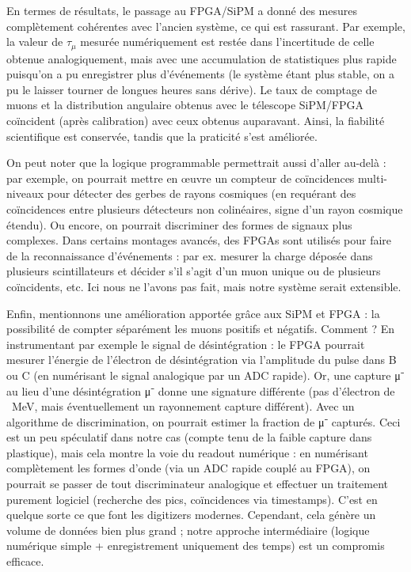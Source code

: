 \documentclass[a4paper,12pt,twoside]{article}
\begin{document}
En termes de résultats, le passage au FPGA/SiPM a donné des mesures complètement cohérentes avec l'ancien système, ce qui est rassurant. Par exemple, la valeur de $\tau_\mu$ mesurée numériquement est restée dans l’incertitude de celle obtenue analogiquement, mais avec une accumulation de statistiques plus rapide puisqu’on a pu enregistrer plus d’événements (le système étant plus stable, on a pu le laisser tourner de longues heures sans dérive). Le taux de comptage de muons et la distribution angulaire obtenus avec le télescope SiPM/FPGA coïncident (après calibration) avec ceux obtenus auparavant. Ainsi, la fiabilité scientifique est conservée, tandis que la praticité s’est améliorée.

On peut noter que la logique programmable permettrait aussi d’aller au-delà : par exemple, on pourrait mettre en œuvre un compteur de coïncidences multi-niveaux pour détecter des gerbes de rayons cosmiques (en requérant des coïncidences entre plusieurs détecteurs non colinéaires, signe d’un rayon cosmique étendu). Ou encore, on pourrait discriminer des formes de signaux plus complexes. Dans certains montages avancés, des FPGAs sont utilisés pour faire de la reconnaissance d’événements : par ex. mesurer la charge déposée dans plusieurs scintillateurs et décider s’il s’agit d’un muon unique ou de plusieurs coïncidents, etc. Ici nous ne l’avons pas fait, mais notre système serait extensible.

Enfin, mentionnons une amélioration apportée grâce aux SiPM et FPGA : la possibilité de compter séparément les muons positifs et négatifs. Comment ? En instrumentant par exemple le signal de désintégration : le FPGA pourrait mesurer l’énergie de l'électron de désintégration via l’amplitude du pulse dans B ou C (en numérisant le signal analogique par un ADC rapide). Or, une capture μ⁻ au lieu d’une désintégration μ⁻ donne une signature différente (pas d’électron de ~MeV, mais éventuellement un rayonnement capture différent). Avec un algorithme de discrimination, on pourrait estimer la fraction de μ⁻ capturés. Ceci est un peu spéculatif dans notre cas (compte tenu de la faible capture dans plastique), mais cela montre la voie du readout numérique : en numérisant complètement les formes d’onde (via un ADC rapide couplé au FPGA), on pourrait se passer de tout discriminateur analogique et effectuer un traitement purement logiciel (recherche des pics, coïncidences via timestamps). C’est en quelque sorte ce que font les digitizers modernes. Cependant, cela génère un volume de données bien plus grand ; notre approche intermédiaire (logique numérique simple + enregistrement uniquement des temps) est un compromis efficace.
\end{document}
